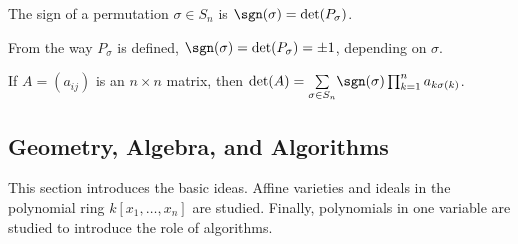                 \begin{definition}
                    The sign of a permutation $\sigma\in S_{n}$
                    is $\sgn(\sigma) = \det(P_{\sigma})$.
                \end{definition}
                \begin{remark}
                    From the way $P_{\sigma}$ is defined,
                    $\sgn(\sigma)=\det(P_{\sigma})=\pm 1$,
                    depending on $\sigma$.
                \end{remark}
                \begin{theorem}
                    If $A=(a_{ij})$ is an $n\times n$ matrix, then
                    $\det(A)=\underset{\sigma\in S_n}%
                     \sum\sgn(\sigma)\prod_{k=1}^{n}a_{k\sigma(k)}$.
                \end{theorem}
        \subsection{Geometry, Algebra, and Algorithms}
            This section introduces the basic ideas. Affine
            varieties and ideals in the polynomial ring
            $k[x_1,\hdots,x_n]$ are studied. Finally, polynomials
            in one variable are studied to introduce the role
            of algorithms.
